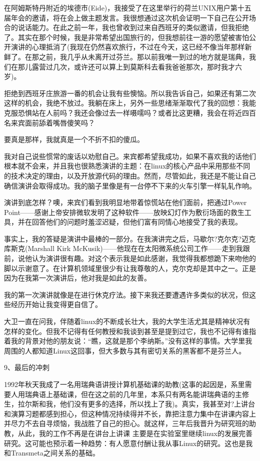 在阿姆斯特丹附近的埃德市(Eide)，我接受了在这里举行的荷兰UNIX用户第十五届年会的邀请，将在会上做主题发言。我很想通过这次机会证明一下自己在公开场合的说话能力。在此之前一年，我也曾收到过来自西班牙的类似邀请，但我拒绝了。其实在那个时候，我是非常希望出国旅行的，但我想前往一游的愿望被害怕公开演讲的心理抵消了(我现在仍然喜欢旅行，不过在今天，这已经不像当年那样新鲜了。在那之前，我几乎从未离开过芬兰。那以前我唯一到过的地方就是瑞典，我们在那儿露营过几次，或许还可以算上到莫斯科去看我爸爸那次，那时我才六岁)。

拒绝到西班牙庄旅游一番的机会让我有些懊恼。所以我告诉自己，如果还有第二次这样的机会，我绝不放过。我躺在床上，另外一些思绪渐渐取代了我的回想：我能克服恐惧站在人前吗？我还会像过去一样嗫嚅吗？或者比这更糟，我会在将近四百名来宾面前舔着嘴唇傻笑吗？

要真是那样，我就真是一个不折不扣的傻瓜。

我对自己说些惯常的废话以劝慰自己。来宾都希望我成功，如果不喜欢我的话他们根本就不会来，并且我也很熟悉演讲的主题：在linux的核心产品中采用那些不同的技术决定的理由，以及开放源代码的理由。然而，尽管如此，我还是不能让自己确信演讲会取得成功。我的脑子里像是有一台停不下来的火车引擎一样轧轧作响。

演讲到底怎样？噢，来宾们看到我明显地带着惊慌站在他们面前，把通过Power Point——感谢上帝安排微软发明了这种软件——放映幻灯作为敷衍场面的救生工具，并在回答他们的问题时羞涩迟疑，但他们富有同情心地接受了我的表现。

事实上，我的答疑是演讲中最棒的一部分。在我演讲完之后，马歇尔?克尔克?迈克库斯克(Marshall Kirk McKusik)——他现在在太阳微系统公司工作——走到我跟前，说他认为演讲很有趣。对这个表示我是如此感谢，我觉得我都想跪下来吻他的脚以示谢意了。在计算机领域里很少有让我尊敬的人，克尔克却是其中之一。正是因为在我第一次演讲后，他对我是如此的友善。

我的第一次演讲就像是在进行休克疗法。接下来我还要遭遇许多类似的状况，但这些经历开始让我变得更自信了。

大卫一直在问我，伴随着linux的不断成长壮大，我的大学生活尤其是精神状况有怎样的变化。但我不记得有任何教授和我谈到甚至是提到过它，我也不记得有谁指着我的背景对他的朋友说：“瞧，这就是那个李纳斯。”没有这样的事情。大学里我周围的人都知道Linux这回事，但大多数与其有密切关系的黑客都不是芬兰人。

 
9、最后的冲刺

1992年秋天我成了一名用瑞典语讲授计算机基础课的助教(这事的起因是，系里需要人用瑞典语上基础课，但在这之前的几年里，本系只有两名能讲瑞典语的主修生，拉尔斯和我，他们没有更多的选择，所以找上了我)。真实，我甚至对?上讲台和演算习题都感到担心，但这种情况持续得并不长，靠把注意力集中在讲课内容上并尽力不去自寻烦恼，我战胜了自己的担心。就这样，三年后我晋升为研究班的助教，从此，我的工作不再是在讲台上讲课 主要是在实验室里继续linux的发展完善研究。这可能也预示着一种趋势：有人愿意付酬让我从事Linux的研究。这也是我和Transmeta之间关系的基础。

